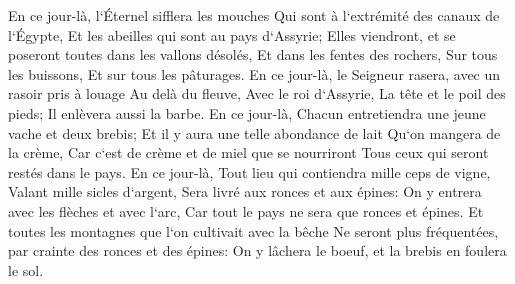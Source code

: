 \verse En ce jour-là, l`Éternel sifflera les mouches Qui sont à l`extrémité des canaux de l`Égypte, Et les abeilles qui sont au pays d`Assyrie; 
\verse Elles viendront, et se poseront toutes dans les vallons désolés, Et dans les fentes des rochers, Sur tous les buissons, Et sur tous les pâturages. 
\verse En ce jour-là, le Seigneur rasera, avec un rasoir pris à louage Au delà du fleuve, Avec le roi d`Assyrie, La tête et le poil des pieds; Il enlèvera aussi la barbe. 
\verse En ce jour-là, Chacun entretiendra une jeune vache et deux brebis; 
\verse Et il y aura une telle abondance de lait Qu`on mangera de la crème, Car c`est de crème et de miel que se nourriront Tous ceux qui seront restés dans le pays. 
\verse En ce jour-là, Tout lieu qui contiendra mille ceps de vigne, Valant mille sicles d`argent, Sera livré aux ronces et aux épines: 
\verse On y entrera avec les flèches et avec l`arc, Car tout le pays ne sera que ronces et épines. 
\verse Et toutes les montagnes que l`on cultivait avec la bêche Ne seront plus fréquentées, par crainte des ronces et des épines: On y lâchera le boeuf, et la brebis en foulera le sol. 

\chapter{}


